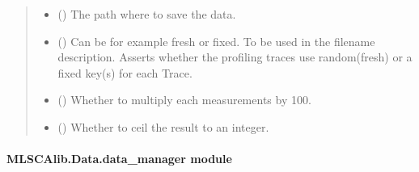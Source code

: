 \documentclass[letterpaper,10pt,english]{sphinxmanual}
\begin{document}
\begin{fulllineitems}
\begin{quote}
\begin{description}
\begin{itemize}
\item {} 
\sphinxAtStartPar
{} (\sphinxstyleliteralemphasis{\sphinxupquote{, }}) \textendash{} The path where to save the data.

\item {} 
\sphinxAtStartPar
{} (\sphinxstyleliteralemphasis{\sphinxupquote{, }}) \textendash{} Can be for example fresh or fixed. To be used in the filename description. Asserts whether the profiling
traces use random(fresh) or a fixed key(s) for each Trace.

\item {} 
\sphinxAtStartPar
{} () \textendash{} Whether to multiply each measurements by 100.

\item {} 
\sphinxAtStartPar
{} (\sphinxstyleliteralemphasis{\sphinxupquote{, }}) \textendash{} Whether to ceil the result to an integer.

\end{itemize}

\end{description}\end{quote}

\end{fulllineitems}



\paragraph{MLSCAlib.Data.data\_manager module}
\label{\detokenize{MLSCAlib.Data:module-MLSCAlib.Data.data_manager}}\label{\detokenize{MLSCAlib.Data:mlscalib-data-data-manager-module}}
\end{document}
